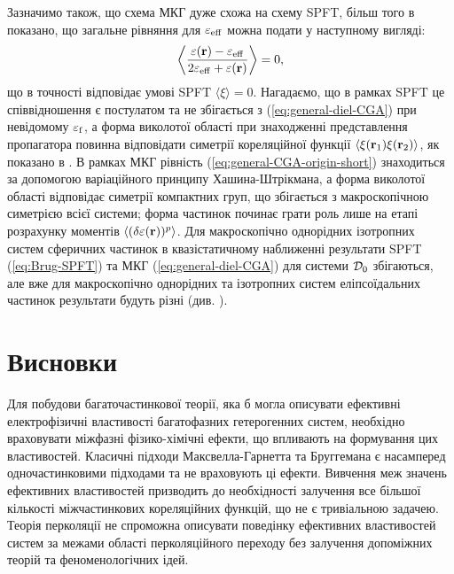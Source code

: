 \documentclass[14pt,twoside]{vakthesis}
\begin{document}
Зазначимо також, що схема МКГ дуже схожа на схему SPFT, більш того в \cite{Sushko2017} показано, що загальне рівняння для $\varepsilon_{\rm eff}$ можна подати у наступному вигляді:
\begin{equation}\label{eq:general-CGA-origin-short}
\left\langle \frac{\varepsilon({\bf r}) - \varepsilon_{\rm eff}}{2\varepsilon_{\rm eff} + \varepsilon({\bf r})} \right\rangle = 0,
\end{equation}
що в точності відповідає умові SPFT $\langle \xi \rangle = 0$. Нагадаємо, що в рамках SPFT це співвідношення є постулатом та не збігається з (\ref{eq:general-diel-CGA}) при невідомому $\varepsilon_{\rm f}$, а форма виколотої області при знаходженні представлення пропагатора повинна відповідати симетрії кореляційної функції $\langle \xi({\bf r}_1) \xi({\bf r}_2) \rangle$, як показано в \cite{Sushko2017}. В рамках МКГ рівність (\ref{eq:general-CGA-origin-short}) знаходиться за допомогою варіаційного принципу Хашина-Штрікмана, а форма виколотої області відповідає симетрії компактних груп, що збігається з макроскопічною симетрією всієї системи; форма частинок починає грати роль лише на етапі розрахунку моментів $\langle (\delta\varepsilon({\bf r}))^p \rangle$.
Для макроскопічно однорідних ізотропних систем сферичних частинок в квазістатичному наближенні результати SPFT (\ref{eq:Brug-SPFT}) та МКГ (\ref{eq:general-diel-CGA}) для системи ${\cal D}_0$ збігаються, але вже для макроскопічно однорідних та ізотропних систем еліпсоїдальних частинок результати будуть різні (див. \cite{Tsang1981,SushkoJPD2009}).


\section{Висновки}

Для побудови багаточастинкової теорії, яка б могла описувати ефективні електрофізичні властивості багатофазних гетерогенних систем, необхідно враховувати міжфазні фізико-хімічні ефекти, що впливають на формування цих властивостей. 
Класичні підходи Максвелла-Гарнетта та Бруггемана є насамперед одночастинковими підходами та не враховують ці ефекти. Вивчення меж значень ефективних властивостей призводить до необхідності залучення все більшої кількості міжчастинкових кореляційних функцій, що не є тривіальною задачею. Теорія перколяції не спроможна описувати поведінку ефективних властивостей систем за межами області перколяційного переходу без залучення допоміжних теорій та феноменологічних ідей. 
\end{document}
